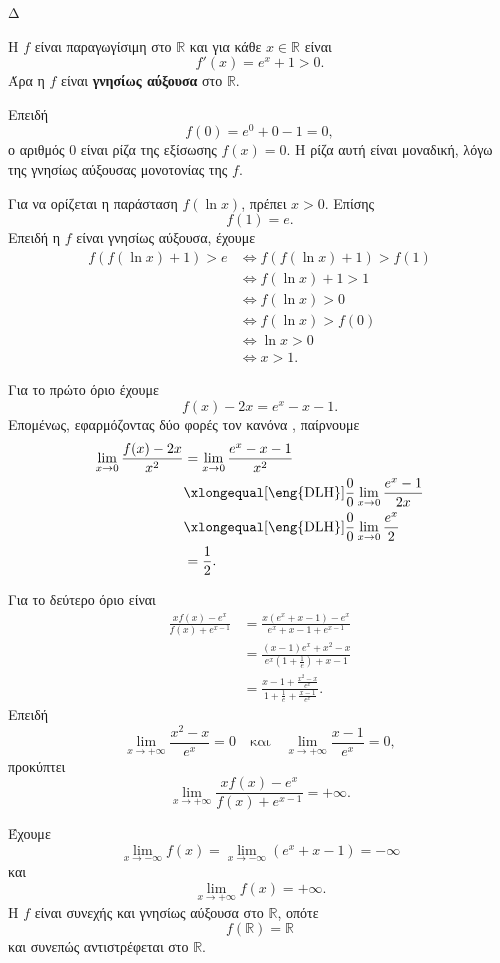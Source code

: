 \begin{thema}{Δ}
\begin{erwthma}
\item Η $f$ είναι παραγωγίσιμη στο $\mathbb{R}$ και για κάθε $x\in\mathbb{R}$ είναι
\[
f'(x)=e^x+1>0.
\]
Άρα η $f$ είναι \textbf{γνησίως αύξουσα} στο $\mathbb{R}$.

Επειδή
\[
f(0)=e^0+0-1=0,
\]
ο αριθμός $0$ είναι ρίζα της εξίσωσης $f(x)=0$. Η ρίζα αυτή είναι μοναδική, λόγω της γνησίως αύξουσας μονοτονίας της $f$.

Για να ορίζεται η παράσταση $f(\ln x)$, πρέπει $x>0$. Επίσης
\[
f(1)=e.
\]
Επειδή η $f$ είναι γνησίως αύξουσα, έχουμε
\begin{align*}
f\left(f(\ln x)+1\right)>e
&\Leftrightarrow
f\left(f(\ln x)+1\right)>f(1)\\
&\Leftrightarrow
f(\ln x)+1>1\\
&\Leftrightarrow
f(\ln x)>0\\
&\Leftrightarrow
f(\ln x)>f(0)\\
&\Leftrightarrow
\ln x>0\\
&\Leftrightarrow
{x>1}.
\end{align*}

\item Για το πρώτο όριο έχουμε
\[
f(x)-2x=e^x-x-1.
\]
Επομένως, εφαρμόζοντας δύο φορές τον κανόνα , παίρνουμε
\begin{align*}
\lim_{x\to0}\frac{f(x)-2x}{x^2}
&=\lim_{x\to0}\frac{e^x-x-1}{x^2}\\
&\xlongequal[\text{\eng{DLH}}]{\frac{0}{0}}
\lim_{x\to0}\frac{e^x-1}{2x}\\
&\xlongequal[\text{\eng{DLH}}]{\frac{0}{0}}
\lim_{x\to0}\frac{e^x}{2}\\
&={\frac{1}{2}}.
\end{align*}

Για το δεύτερο όριο είναι
\begin{align*}
\frac{xf(x)-e^x}{f(x)+e^{x-1}}
&=\frac{x(e^x+x-1)-e^x}{e^x+x-1+e^{x-1}}\\
&=\frac{(x-1)e^x+x^2-x}
{e^x\left(1+\frac{1}{e}\right)+x-1}\\
&=\frac{x-1+\frac{x^2-x}{e^x}}
{1+\frac{1}{e}+\frac{x-1}{e^x}}.
\end{align*}
Επειδή
\[
\lim_{x\to+\infty}\frac{x^2-x}{e^x}=0
\quad\text{και}\quad
\lim_{x\to+\infty}\frac{x-1}{e^x}=0,
\]
προκύπτει
\[
{
\lim_{x\to+\infty}
\frac{xf(x)-e^x}{f(x)+e^{x-1}}
=+\infty}.
\]

\item Έχουμε
\[
\lim_{x\to-\infty}f(x)
=\lim_{x\to-\infty}(e^x+x-1)
=-\infty
\]
και
\[
\lim_{x\to+\infty}f(x)=+\infty.
\]
Η $f$ είναι συνεχής και γνησίως αύξουσα στο $\mathbb{R}$, οπότε
\[
f(\mathbb{R})=\mathbb{R}
\]
και συνεπώς αντιστρέφεται στο $\mathbb{R}$.


\end{erwthma}
\end{thema}
